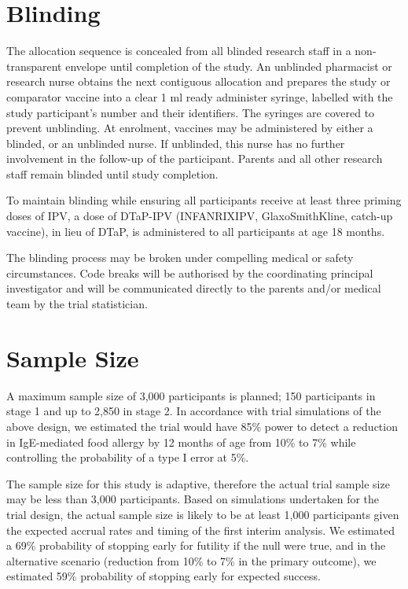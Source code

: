 \documentclass{bmcart}
\begin{document}
\section*{Blinding}

The allocation sequence is concealed from all blinded research staff in a non-transparent envelope until completion of the study.
An unblinded pharmacist or research nurse obtains the next contiguous allocation and prepares the study or comparator vaccine into a clear 1 ml ready administer syringe, labelled with the study participant's number and their identifiers.
The syringes are covered to prevent unblinding.
At enrolment, vaccines may be administered by either a blinded, or an unblinded nurse.
If unblinded, this nurse has no further involvement in the follow-up of the participant.
Parents and all other research staff remain blinded until study completion.

To maintain blinding while ensuring all participants receive at least three priming doses of IPV, a dose of DTaP-IPV (INFANRIX\textregistered IPV, GlaxoSmithKline, catch-up vaccine), in lieu of DTaP, is administered to all participants at age 18 months.

The blinding process may be broken under compelling medical or safety circumstances. 
Code breaks will be authorised by the coordinating principal investigator and will be communicated directly to the parents and/or medical team by the trial statistician.

\section*{Sample Size}

A maximum sample size of 3,000 participants is planned; 150 participants in stage 1 and up to 2,850 in stage 2.
In accordance with trial simulations of the above design, we estimated the trial would have 85\% power to detect a reduction in IgE-mediated food allergy by 12 months of age from 10\% to 7\% while controlling the probability of a type I error at 5\%.

The sample size for this study is adaptive, therefore the actual trial sample size may be less than 3,000 participants. Based on simulations undertaken for the trial design, the actual sample size is likely to be at least 1,000 participants given the expected accrual rates and timing of the first interim analysis.
We estimated a 69\% probability of stopping early for futility if the null were true, and in the alternative scenario (reduction from 10\% to 7\% in the primary outcome), we estimated 59\% probability of stopping early for expected success.
\end{document}
